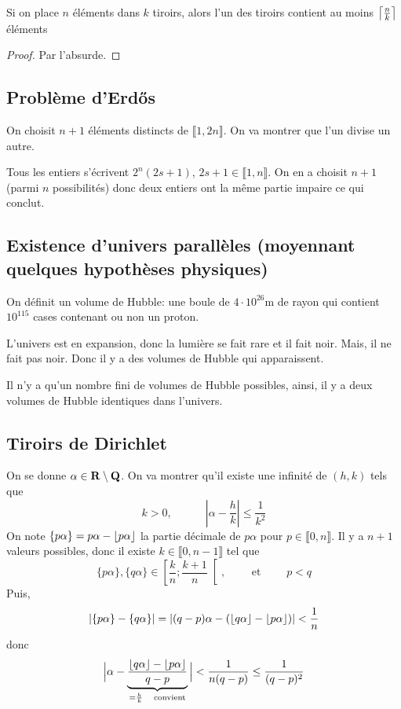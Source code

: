 \begin{prop}
    Si on place $n$ éléments dans $k$ tiroirs, alors l'un des tiroirs contient au moins $\left\lceil\frac nk\right\rceil$ éléments
\end{prop}

\begin{proof}
    Par l'absurde.
\end{proof}

\subsection{Problème d'Erdős}

On choisit $n+1$ éléments distincts de $\llbracket 1, 2n\rrbracket$. On va montrer que l'un divise un autre.

Tous les entiers s'écrivent $2^n(2s+1)$, $2s+1\in\llbracket 1, n\rrbracket$. On en a choisit $n+1$ (parmi $n$ possibilités) donc deux entiers ont la même partie impaire ce qui conclut.

\subsection{Existence d'univers parallèles (moyennant quelques hypothèses physiques)}

On définit un volume de Hubble: une boule de $4\cdot 10^{26}$m de rayon qui contient $10^{115}$ cases contenant ou non un proton.

L'univers est en expansion, donc la lumière se fait rare et il fait noir. Mais, il ne fait pas noir. Donc il y a des volumes de Hubble qui apparaissent.

Il n'y a qu'un nombre fini de volumes de Hubble possibles, ainsi, il y a deux volumes de Hubble identiques dans l'univers.

\subsection{Tiroirs de Dirichlet}

On se donne $\alpha\in\mathbf R\setminus \mathbf Q$. On va montrer qu'il existe une infinité de $(h, k)$ tels que \[
    k>0,\qquad \quad \left| \alpha-\frac hk \right|\leq \frac1{k^2}
\]
On note $\{p\alpha\}=p\alpha-\left\lfloor p\alpha\right\rfloor$ la partie décimale de $p\alpha$ pour $p\in\llbracket 0, n\rrbracket$. Il y a $n+1$ valeurs possibles, donc il existe $k\in\llbracket 0, n-1\rrbracket$ tel que \[
    \{p\alpha\}, \{q\alpha\}\in \left[ \frac kn;\frac {k+1}n \right[,\qquad \text{ et }\qquad p<q
\]
Puis, \[
    |\{p\alpha\}-\{q\alpha\}|=|(q-p)\alpha-(\left\lfloor q\alpha\right\rfloor-\left\lfloor p\alpha\right\rfloor)|<\frac1n
\]
donc \[
    \Big|\alpha-\underbrace{\frac{\left\lfloor q\alpha\right\rfloor-\left\lfloor p\alpha\right\rfloor}{q-p}}_{=\frac hk\quad \text{convient}}\Big|<\frac1{n(q-p)}\leq \frac1{(q-p)^2}
\]

